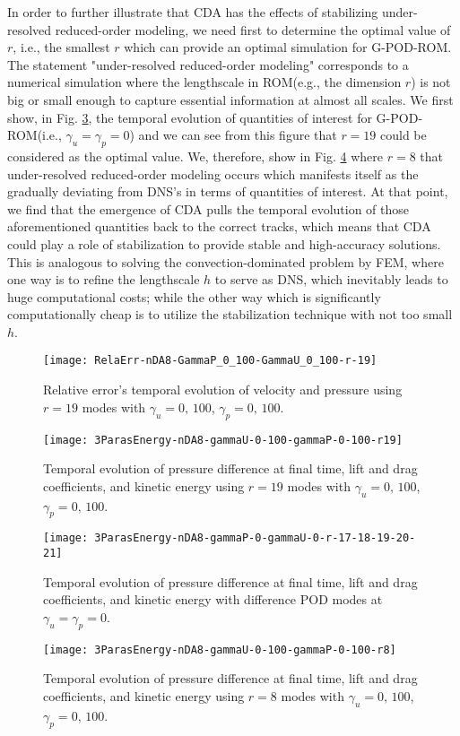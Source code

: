 \documentclass[10pt,twoside,openany,UTF8,CJK]{article}
\begin{document}
	\indent In order to further illustrate that CDA has the effects of stabilizing under-resolved reduced-order modeling, we need first to determine the optimal value of $r$, i.e., the smallest $r$ which can provide an optimal simulation for G-POD-ROM. The statement "under-resolved reduced-order modeling" corresponds to a numerical simulation where the lengthscale in ROM(e.g., the dimension $r$) is not big or small enough to capture essential information at almost all scales. We first show, in Fig. \ref{3ParasEnergy-nDA8-gammaP-0-gammaU-0-r-17-18-19-20-21}, the temporal evolution of quantities of interest for G-POD-ROM(i.e., $\gamma_u=\gamma_p=0$) and we can see from this figure that $r=19$ could be considered as the optimal value. We, therefore, show in Fig. \ref{3ParasEnergy-nDA8-gammaU-0-100-gammaP-0-100-r8} where $r=8$ that under-resolved reduced-order modeling occurs which manifests itself as the gradually deviating from DNS's in terms of quantities of interest. At that point, we find that the emergence of CDA pulls the temporal evolution of those aforementioned quantities back to the correct tracks, which means that CDA could play a role of stabilization to provide stable and high-accuracy solutions. This is analogous to solving the convection-dominated problem by FEM, where one way is to refine the lengthscale $h$ to serve as DNS, which inevitably leads to huge computational costs; while the other way which is significantly computationally cheap is to utilize the stabilization technique with not too small $h$.
    \begin{figure}
    	\centering
    	\texttt{[image: RelaErr-nDA8-GammaP\_0\_100-GammaU\_0\_100-r-19]}
    	\caption{Relative error's temporal evolution of velocity and pressure using $r=19$ modes with $\gamma_u=0,\,100$, $\gamma_p=0,\,100$.}\label{RelaErr-nDA8-GammaP_0_100-GammaU_0_100-r-19}
    \end{figure}
    \begin{figure}
    	\centering
    	\texttt{[image: 3ParasEnergy-nDA8-gammaU-0-100-gammaP-0-100-r19]}
    	\caption{Temporal evolution of pressure difference at final time, lift and drag coefficients, and kinetic energy using $r=19$ modes with $\gamma_u=0,\,100$, $\gamma_p=0,\,100$.}\label{3ParasEnergy-nDA8-gammaU-0-100-gammaP-0-100-r19}
    \end{figure}
    \begin{figure}
    	\centering
    	\texttt{[image: 3ParasEnergy-nDA8-gammaP-0-gammaU-0-r-17-18-19-20-21]}
    	\caption{Temporal evolution of pressure difference at final time, lift and drag coefficients, and kinetic energy with difference POD modes at $\gamma_u=\gamma_p=0$.}\label{3ParasEnergy-nDA8-gammaP-0-gammaU-0-r-17-18-19-20-21}
    \end{figure}
    \begin{figure}
    	\centering
    	\texttt{[image: 3ParasEnergy-nDA8-gammaU-0-100-gammaP-0-100-r8]}
    	\caption{Temporal evolution of pressure difference at final time, lift and drag coefficients, and kinetic energy using $r=8$ modes with $\gamma_u=0,\,100$, $\gamma_p=0,\,100$.}\label{3ParasEnergy-nDA8-gammaU-0-100-gammaP-0-100-r8}
    \end{figure}	
\end{document}
